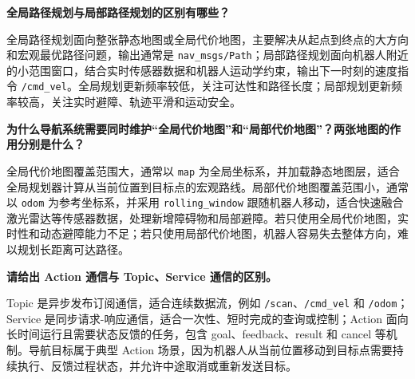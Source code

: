 \documentclass[11pt,a4paper,fontset=fandol]{ctexart}
\begin{document}
\textbf{全局路径规划与局部路径规划的区别有哪些？}

全局路径规划面向整张静态地图或全局代价地图，主要解决从起点到终点的大方向和宏观最优路径问题，输出通常是 \verb|nav_msgs/Path|；局部路径规划面向机器人附近的小范围窗口，结合实时传感器数据和机器人运动学约束，输出下一时刻的速度指令 \verb|/cmd_vel|。全局规划更新频率较低，关注可达性和路径长度；局部规划更新频率较高，关注实时避障、轨迹平滑和运动安全。

\textbf{为什么导航系统需要同时维护“全局代价地图”和“局部代价地图”？两张地图的作用分别是什么？}

全局代价地图覆盖范围大，通常以 \verb|map| 为全局坐标系，并加载静态地图层，适合全局规划器计算从当前位置到目标点的宏观路线。局部代价地图覆盖范围小，通常以 \verb|odom| 为参考坐标系，并采用 \verb|rolling_window| 跟随机器人移动，适合快速融合激光雷达等传感器数据，处理新增障碍物和局部避障。若只使用全局代价地图，实时性和动态避障能力不足；若只使用局部代价地图，机器人容易失去整体方向，难以规划长距离可达路径。

\textbf{请给出 Action 通信与 Topic、Service 通信的区别。}

Topic 是异步发布订阅通信，适合连续数据流，例如 \verb|/scan|、\verb|/cmd_vel| 和 \verb|/odom|；Service 是同步请求-响应通信，适合一次性、短时完成的查询或控制；Action 面向长时间运行且需要状态反馈的任务，包含 goal、feedback、result 和 cancel 等机制。导航目标属于典型 Action 场景，因为机器人从当前位置移动到目标点需要持续执行、反馈过程状态，并允许中途取消或重新发送目标。
\end{document}
